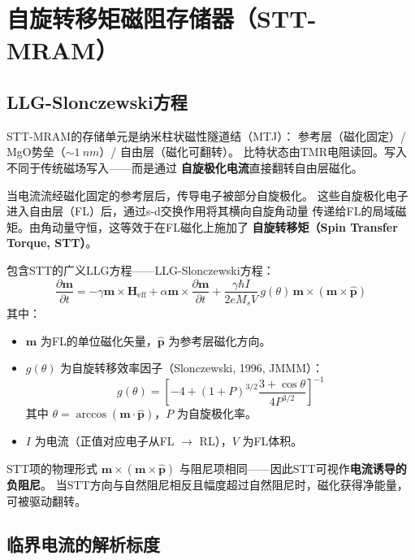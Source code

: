 \documentclass[11pt,a4paper,twoside]{article}
\theoremstyle{definition}\newtheorem{definition}{定义}[section]
\theoremstyle{plain}\newtheorem{theorem}{定理}[section]
\theoremstyle{remark}\newtheorem{remark}{注解}[section]
\begin{document}
\section{自旋转移矩磁阻存储器（STT-MRAM）}
\label{sec:stt}

\subsection{LLG-Slonczewski方程}

STT-MRAM的存储单元是纳米柱状磁性隧道结（MTJ）：
参考层（磁化固定）/ MgO势垒（$\sim \SI{1}{nm}$）/ 自由层（磁化可翻转）。
比特状态由TMR电阻读回。写入不同于传统磁场写入——而是通过
\textbf{自旋极化电流}直接翻转自由层磁化。

当电流流经磁化固定的参考层后，传导电子被部分自旋极化。
这些自旋极化电子进入自由层（FL）后，通过s-d交换作用将其横向自旋角动量
传递给FL的局域磁矩。由角动量守恒，这等效于在FL磁化上施加了
\textbf{自旋转移矩（Spin Transfer Torque, STT）}。

包含STT的广义LLG方程——LLG-Slonczewski方程：
\begin{equation}\label{eq:llg-stt}
  \boxed{
  \frac{\partial \mathbf{m}}{\partial t}
  = -\gamma \mathbf{m} \times \mathbf{H}_{\text{eff}}
  + \alpha \mathbf{m} \times \frac{\partial \mathbf{m}}{\partial t}
  + \frac{\gamma \hbar I}{2 e M_s V}\, g(\theta)\,
    \mathbf{m} \times (\mathbf{m} \times \hat{\mathbf{p}})
  }
\end{equation}
其中：
\begin{itemize}
  \item $\mathbf{m}$ 为FL的单位磁化矢量，$\hat{\mathbf{p}}$ 为参考层磁化方向。
  \item $g(\theta)$ 为自旋转移效率因子（Slonczewski, 1996, JMMM）：
  \begin{equation}
    g(\theta) = \left[ -4 + (1+P)^{3/2} \frac{3 + \cos\theta}{4 P^{3/2}} \right]^{-1}
  \end{equation}
  其中 $\theta = \arccos(\mathbf{m}\cdot\hat{\mathbf{p}})$，$P$ 为自旋极化率。
  \item $I$ 为电流（正值对应电子从FL $\to$ RL），$V$ 为FL体积。
\end{itemize}

STT项的物理形式 $\mathbf{m} \times (\mathbf{m} \times \hat{\mathbf{p}})$
与阻尼项相同——因此STT可视作\textbf{电流诱导的负阻尼}。
当STT方向与自然阻尼相反且幅度超过自然阻尼时，磁化获得净能量，
可被驱动翻转。

\subsection{临界电流的解析标度}
\end{document}
